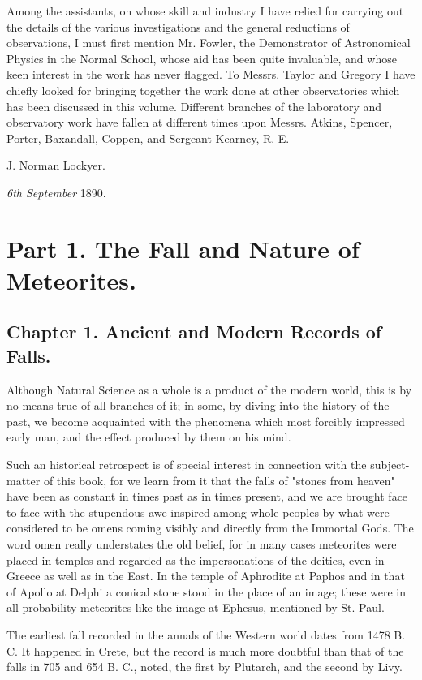 \documentclass[a4paper, 12pt, oneside, polutonikogreek, english]{article}
\begin{document}
Among the assistants, on whose skill and industry I have relied for carrying out the details of the various investigations and the general reductions of observations, I must first mention Mr. Fowler, the Demonstrator of Astronomical Physics in the Normal School, whose aid has been quite invaluable, and whose keen interest in the work has never flagged. To Messrs. Taylor and Gregory I have chiefly looked for bringing together the work done at other observatories which has been discussed in this volume. Different branches of the laboratory and observatory work have fallen at different times upon Messrs. Atkins, Spencer, Porter, Baxandall, Coppen, and Sergeant Kearney, R. E.

J. Norman Lockyer.

\emph{6th September} 1890.

\section{Part 1. The Fall and Nature of Meteorites.}

\subsection{Chapter 1. Ancient and Modern Records of Falls.}

Although Natural Science as a whole is a product of the modern world, this is by no means true of all branches of it; in some, by diving into the history of the past, we become acquainted with the phenomena which most forcibly impressed early man, and the effect produced by them on his mind.

Such an historical retrospect is of special interest in connection with the subject-matter of this book, for we learn from it that the falls of "stones from heaven" have been as constant in times past as in times present, and we are brought face to face with the stupendous awe inspired among whole peoples by what were considered to be omens coming visibly and directly from the Immortal Gods. The word omen really understates the old belief, for in many cases meteorites were placed in temples and regarded as the impersonations of the deities, even in Greece as well as in the East. In the temple of Aphrodite at Paphos and in that of Apollo at Delphi a conical stone stood in the place of an image; these were in all probability meteorites like the image at Ephesus, mentioned by St. Paul.

The earliest fall recorded in the annals of the Western world dates from 1478 B. C. It happened in Crete, but the record is much more doubtful than that of the falls in 705 and 654 B. C., noted, the first by Plutarch, and the second by Livy.
\end{document}
